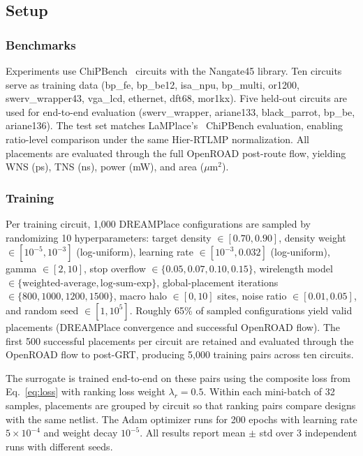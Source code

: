 \documentclass[sigconf,anonymous,review,9pt]{acmart}
\begin{document}
\subsection{Setup}
\label{subsec:setup}

\subsubsection{Benchmarks}
Experiments use ChiPBench~\cite{chipbench2025} circuits with the
Nangate45 library. Ten circuits serve as training data (bp\_fe,
bp\_be12, isa\_npu, bp\_multi, or1200, swerv\_wrapper43, vga\_lcd,
ethernet, dft68, mor1kx). Five held-out circuits are used for
end-to-end evaluation (swerv\_wrapper, ariane133, black\_parrot,
bp\_be, ariane136). The test set matches
LaMPlace's~\cite{lamplace2025} ChiPBench evaluation, enabling
ratio-level comparison under the same Hier-RTLMP normalization. All
placements are evaluated through the full OpenROAD post-route flow,
yielding WNS (ps), TNS (ns), power (mW), and area ($\mu$m$^2$).

\subsubsection{Training}
Per training circuit, 1{,}000 DREAMPlace configurations are sampled
by randomizing 10 hyperparameters: target density
$\in [0.70, 0.90]$, density weight $\in [10^{-5}, 10^{-3}]$
(log-uniform), learning rate $\in [10^{-3}, 0.032]$ (log-uniform),
gamma $\in [2, 10]$, stop overflow
$\in \{0.05, 0.07, 0.10, 0.15\}$, wirelength model \\
$\in \{\text{weighted-average}, \text{log-sum-exp}\}$, global-placement iterations
$\in \{800, 1000, 1200, 1500\}$, macro halo $\in [0, 10]$ sites,
noise ratio $\in [0.01, 0.05]$, and random seed $\in [1, 10^5]$.
Roughly 65\% of sampled configurations yield valid placements
(DREAMPlace convergence and successful OpenROAD flow). The
first 500 successful placements per circuit are retained and
evaluated through the OpenROAD flow to post-GRT, producing 5{,}000
training pairs across ten circuits.

The surrogate is trained end-to-end on these pairs using the composite
loss from Eq.~\ref{eq:loss} with ranking loss weight
$\lambda_r = 0.5$. Within each mini-batch of 32 samples, placements
are grouped by circuit so that ranking pairs compare designs with the
same netlist. The Adam optimizer runs for 200 epochs with learning
rate $5 \times 10^{-4}$ and weight decay $10^{-5}$. All results
report mean $\pm$ std over 3 independent runs with different seeds.
\end{document}
